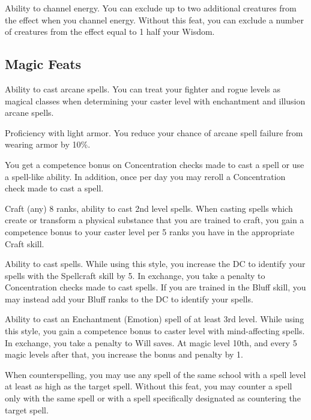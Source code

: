  Ability to channel energy.
 You can exclude up to two additional creatures from the effect when you channel energy.
 Without this feat, you can exclude a number of creatures from the effect equal to 1 \add half your Wisdom.

\subsection{Magic Feats}

\featpre Ability to cast arcane spells.
\featben You can treat your fighter and rogue levels as magical classes when determining your caster level with enchantment and illusion arcane spells.

\featpre Proficiency with light armor.
\featben You reduce your chance of arcane spell failure from wearing armor by 10\%. 

 You get a  competence bonus on Concentration checks made to cast a spell or use a spell-like ability. In addition, once per day you may reroll a Concentration check made to cast a spell.

\featpres Craft (any) 8 ranks, ability to cast 2nd level spells.
\featben When casting spells which create or transform a physical substance that you are trained to craft, you gain a  competence bonus to your caster level per 5 ranks you have in the appropriate Craft skill.

\featpre Ability to cast spells.
\featben While using this style, you increase the DC to identify your spells with the Spellcraft skill by 5. In exchange, you take a  penalty to Concentration checks made to cast spells. If you are trained in the Bluff skill, you may instead add your Bluff ranks to the DC to identify your spells.

\featpre Ability to cast an Enchantment (Emotion) spell of at least 3rd level.
\featben While using this style, you gain a  competence bonus to caster level with mind-affecting spells. In exchange, you take a  penalty to Will saves. At magic level 10th, and every 5 magic levels after that, you increase the bonus and penalty by 1.

 When counterspelling, you may use any spell of the same school with a spell level at least as high as the target spell.
 Without this feat, you may counter a spell only with the same spell or with a spell specifically designated as countering the target spell.

